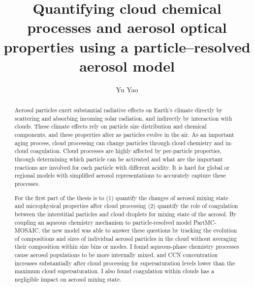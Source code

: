 \documentclass[edeposit,fullpage]{uiucthesis2009}
\begin{document}
\title{Quantifying cloud chemical processes and aerosol optical properties using a particle--resolved aerosol model}
\author{Yu Yao}
\phdthesis
{}
\maketitle


\frontmatter

\begin{abstract}
Aerosol particles exert substantial radiative effects on Earth's climate directly by scattering and absorbing incoming solar radiation, and indirectly by interaction with clouds. These climate effects rely on particle size distribution and chemical components, and these properties alter as particles evolve in the air. As an important aging process, cloud processing can change particles through cloud chemistry and in-cloud coagulation. Cloud processes are highly affected by per-particle properties, through determining which particle can be activated and what are the important reactions are involved for each particle with different acidity. It is hard for global or regional models with simplified aerosol representations to accurately capture these processes. 

For the first part of the thesis is to (1) quantify the changes of aerosol mixing state and microphysical properties after cloud processing (2) quantify the role of coagulation between the interstitial particles and cloud droplets for mixing state of the aerosol. By coupling an aqueous chemistry mechanism to particle-resolved model PartMC-MOSAIC, the new model was able to answer these questions by tracking the evolution of compositions and sizes of individual aerosol particles in the cloud without averaging their composition within size bins or modes. I found aqueous-phase chemistry processes cause aerosol populations to be more internally mixed, and CCN concentration increases substantially after cloud processing for supersaturation levels lower than the maximum cloud supersaturation. I also found coagulation within clouds has a negligible impact on aerosol mixing state.


\end{abstract}
\end{document}
